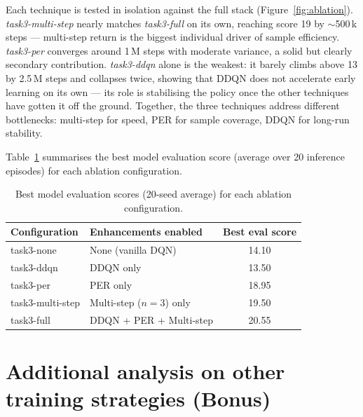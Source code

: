 \documentclass[12pt,a4paper]{report}
\begin{document}
Each technique is tested in isolation against the full stack (Figure~\ref{fig:ablation}).
\textit{task3-multi-step} nearly matches \textit{task3-full} on its own, reaching score 19
by $\sim$500\,k steps --- multi-step return is the biggest individual driver of sample efficiency.
\textit{task3-per} converges around 1\,M steps with moderate variance, a solid but clearly
secondary contribution.
\textit{task3-ddqn} alone is the weakest: it barely climbs above 13 by 2.5\,M steps and
collapses twice, showing that DDQN does not accelerate early learning on its own ---
its role is stabilising the policy once the other techniques have gotten it off the ground.
Together, the three techniques address different bottlenecks: multi-step for speed,
PER for sample coverage, DDQN for long-run stability.

Table~\ref{tab:ablation-best} summarises the best model evaluation score (average over
20 inference episodes) for each ablation configuration.

\begin{table}[H]
\centering
\caption{Best model evaluation scores (20-seed average) for each ablation configuration.}
\label{tab:ablation-best}
{\setlength{\tabcolsep}{18pt}
\begin{tabular}{llc}
\toprule
\textbf{Configuration} & \textbf{Enhancements enabled} & \textbf{Best eval score} \\
\midrule
task3-none       & None (vanilla DQN)         & 14.10   \\
task3-ddqn       & DDQN only                           & 13.50   \\
task3-per        & PER only                            & 18.95   \\
task3-multi-step & Multi-step ($n{=}3$) only           & 19.50   \\
task3-full       & DDQN + PER + Multi-step             & 20.55 \\
\bottomrule
\end{tabular}}
\end{table}

\newpage


\section{Additional analysis on other training strategies (Bonus)}
\end{document}
